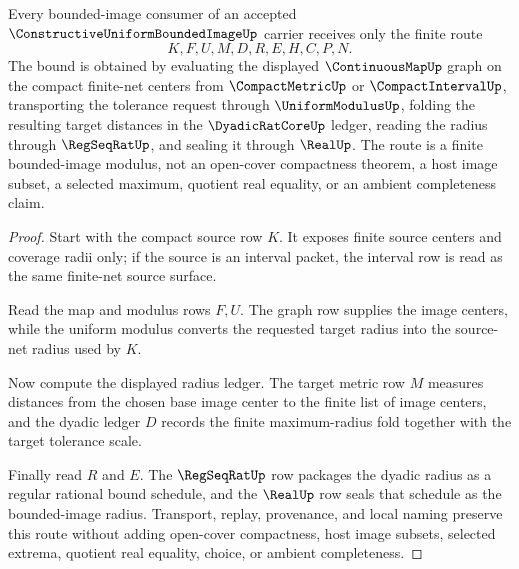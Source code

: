 \begin{theorem}
\label{thm:constructive-uniform-bounded-image-finite-net-bound}
Every bounded-image consumer of an accepted $\ConstructiveUniformBoundedImageUp$ carrier receives only the finite route
$$
K,F,U,M,D,R,E,H,C,P,N .
$$
The bound is obtained by evaluating the displayed $\ContinuousMapUp$ graph on the compact finite-net centers from $\CompactMetricUp$ or $\CompactIntervalUp$, transporting the tolerance request through $\UniformModulusUp$, folding the resulting target distances in the $\DyadicRatCoreUp$ ledger, reading the radius through $\RegSeqRatUp$, and sealing it through $\RealUp$. The route is a finite bounded-image modulus, not an open-cover compactness theorem, a host image subset, a selected maximum, quotient real equality, or an ambient completeness claim.
\end{theorem}
\begin{proof}
Start with the compact source row $K$. It exposes finite source centers and coverage radii only; if the source is an interval packet, the interval row is read as the same finite-net source surface.

Read the map and modulus rows $F,U$. The graph row supplies the image centers, while the uniform modulus converts the requested target radius into the source-net radius used by $K$.

Now compute the displayed radius ledger. The target metric row $M$ measures distances from the chosen base image center to the finite list of image centers, and the dyadic ledger $D$ records the finite maximum-radius fold together with the target tolerance scale.

Finally read $R$ and $E$. The $\RegSeqRatUp$ row packages the dyadic radius as a regular rational bound schedule, and the $\RealUp$ row seals that schedule as the bounded-image radius. Transport, replay, provenance, and local naming preserve this route without adding open-cover compactness, host image subsets, selected extrema, quotient real equality, choice, or ambient completeness.
\end{proof}


